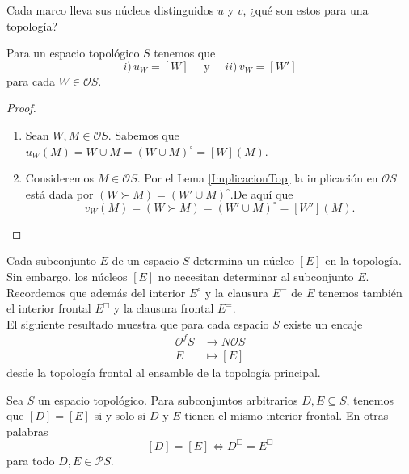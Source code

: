 Cada marco lleva sus núcleos distinguidos $u$ y $v$, ¿qué son estos para una topología?

\begin{lem}\label{UVTop}
     Para un espacio topológico $S$ tenemos que 
     \[
     i)\,u_W=[W]\quad\mbox{ y }\quad ii)\,v_W=[W']
     \]
     para cada $W\in \mathcal{O}S$.
\end{lem}

\begin{proof}
    \begin{enumerate}[$i)$]
        \item Sean $W, M\in \mathcal{O}S$. Sabemos que $u_W(M)=W\cup M=(W\cup M)^\circ=[W](M)$.
        \item Consideremos $M\in \mathcal{O}S$. Por el Lema \ref{ImplicacionTop} la implicación en $\mathcal{O}S$ está dada por $(W\succ M)=(W'\cup M)^\circ$.De aquí que 
        \[
        v_W(M)=(W\succ M)=(W'\cup M)^\circ=[W'](M).
        \]
    \end{enumerate}
\end{proof}

Cada subconjunto $E$ de un espacio $S$ determina un núcleo $[E]$ en la topología. Sin embargo, los núcleos $[E]$ no necesitan determinar al subconjunto $E$.\\

Recordemos que además del interior $E^\circ$ y la clausura $E^-$ de $E$ tenemos también el interior frontal $E^\Box$ y la clausura frontal $E^=$.\\

El siguiente resultado muestra que para cada espacio $S$ existe un encaje 
\[
\begin{split}
    \mathcal{O}^fS& \to N\mathcal{O}S\\
    E& \mapsto [E]
\end{split}
\]
desde la topología frontal al ensamble de la topología principal.

\begin{lem}
    Sea $S$ un espacio topológico. Para subconjuntos arbitrarios $D, E\subseteq S$, tenemos que $[D]=[E]$ si y solo si $D$ y $E$ tienen el mismo interior frontal. En otras palabras
    \[
    [D]=[E]\Leftrightarrow D^\Box =E^\Box
    \]
    para todo $D, E\in \mathcal{P}S$.
\end{lem}

